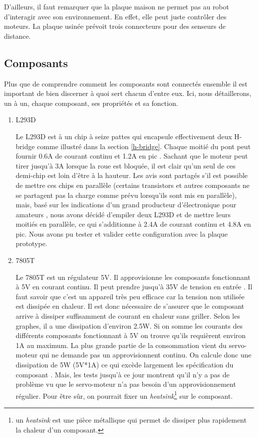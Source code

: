 \documentclass[a4paper,11pt]{report}
\begin{document}
{D'ailleurs, il faut remarquer que la plaque maison ne permet pas au robot d'interagir avec son environnement. En effet, elle peut juste contrôler des moteurs. La plaque usinée prévoit trois connecteurs pour des senseurs de distance.


\subsection{Composants}

Plus que de comprendre comment les composants sont connectés ensemble il est important de bien discerner à quoi sert chacun d'entre eux. Ici, nous détaillerons, un à un, chaque composant, ses propriétés et sa fonction.


\begin{enumerate}
\item L293D

Le L293D est à un chip à seize pattes qui encapsule effectivement deux H-bridge comme illustré dans la section \ref{h-bridge}. Chaque moitié du pont peut fournir 0.6A de courant continu et 1.2A en pic \cite{l293dDataSheet}. Sachant que le moteur peut tirer jusqu'à 3A lorsque la roue est bloquée, il est clair qu'un seul de ces demi-chip est loin d'être à la hauteur. Les avis sont partagés s'il est possible de mettre ces chips en parallèle (certains transistors et autres composants ne se partagent pas la charge comme prévu lorsqu'ils sont mis en parallèle), mais, basé sur les indications d'un grand producteur d'électronique pour amateurs \cite{adafruitMotorShield}, nous avons décidé d'empiler deux L293D et de mettre leurs moitiés en parallèle, ce qui s'additionne à 2.4A de courant continu et 4.8A en pic. Nous avons pu tester et valider cette configuration avec la plaque prototype. 

\item 7805T

Le 7805T est un régulateur 5V. Il approvisionne les composants fonctionnant à 5V en courant continu. Il peut prendre jusqu'à 35V de tension en entrée \cite{7805T}. Il faut savoir que c'est un appareil très peu efficace car la tension non utilisée est dissipée en chaleur. Il est donc nécessaire de s'assurer que le composant arrive à dissiper suffisamment de courant en chaleur sans griller. Selon les graphes, il a une dissipation d'environ 2.5W. Si on somme les courants des différents composants fonctionnant à 5V on trouve qu'ils requièrent environ 1A au maximum. La plus grande partie de la consommation vient du servo-moteur qui ne demande pas un approvisionnent continu. On calcule donc une dissipation de 5W (5V*1A) ce qui excède largement les spécification du composant \cite{7805T}. Mais, les tests jusqu'à ce jour montrent qu'il n'y a pas de problème vu que le servo-moteur n'a pas besoin d'un approvisionnement régulier. Pour être sûr, on pourrait fixer un \textit{heatsink}\footnote{un \textit{heatsink} est une pièce métallique qui permet de dissiper plus rapidement la chaleur d'un composant.} sur le composant.


\end{enumerate}}
\end{document}
